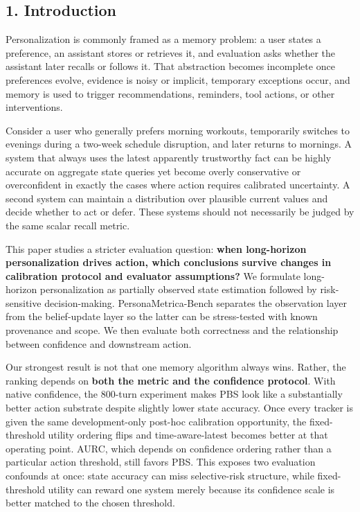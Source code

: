 \subsection{1. Introduction}\label{introduction}

Personalization is commonly framed as a memory problem: a user states a
preference, an assistant stores or retrieves it, and evaluation asks
whether the assistant later recalls or follows it. That abstraction
becomes incomplete once preferences evolve, evidence is noisy or
implicit, temporary exceptions occur, and memory is used to trigger
recommendations, reminders, tool actions, or other interventions.

Consider a user who generally prefers morning workouts, temporarily
switches to evenings during a two-week schedule disruption, and later
returns to mornings. A system that always uses the latest apparently
trustworthy fact can be highly accurate on aggregate state queries yet
become overly conservative or overconfident in exactly the cases where
action requires calibrated uncertainty. A second system can maintain a
distribution over plausible current values and decide whether to act or
defer. These systems should not necessarily be judged by the same scalar
recall metric.

This paper studies a stricter evaluation question: \textbf{when
long-horizon personalization drives action, which conclusions survive
changes in calibration protocol and evaluator assumptions?} We formulate
long-horizon personalization as partially observed state estimation
followed by risk-sensitive decision-making. PersonaMetrica-Bench
separates the observation layer from the belief-update layer so the
latter can be stress-tested with known provenance and scope. We then
evaluate both correctness and the relationship between confidence and
downstream action.

Our strongest result is not that one memory algorithm always wins.
Rather, the ranking depends on \textbf{both the metric and the
confidence protocol}. With native confidence, the 800-turn experiment
makes PBS look like a substantially better action substrate despite
slightly lower state accuracy. Once every tracker is given the same
development-only post-hoc calibration opportunity, the fixed-threshold
utility ordering flips and time-aware-latest becomes better at that
operating point. AURC, which depends on confidence ordering rather than
a particular action threshold, still favors PBS. This exposes two
evaluation confounds at once: state accuracy can miss selective-risk
structure, while fixed-threshold utility can reward one system merely
because its confidence scale is better matched to the chosen threshold.

